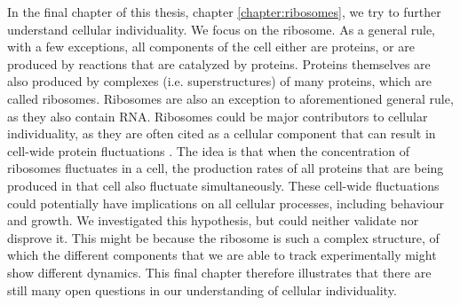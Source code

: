 In the final chapter of this thesis, chapter \ref{chapter:ribosomes}, we try to further understand cellular individuality.
%
We focus on the ribosome.
%
As a general rule, 
with a few exceptions, all components of the cell either are proteins, or are produced by reactions that are catalyzed by proteins.
%
Proteins themselves are also produced by complexes (i.e. superstructures) of many proteins, which are called ribosomes.
%
Ribosomes are also an exception to aforementioned general rule, 
as they also contain RNA.
Ribosomes could be major contributors to cellular individuality,
as they are often cited as a cellular component that can result in cell-wide protein fluctuations \cite{Davidson2008, Raj2008, Chalancon2012, Bruggeman2018}.
%
The idea is that when the concentration of ribosomes fluctuates in a cell, 
the production rates of all proteins that are being produced in that cell also fluctuate simultaneously.
%
These cell-wide fluctuations could potentially have implications on all cellular processes,
including behaviour and growth. 
%
We investigated this hypothesis, but could neither validate nor disprove it.
%
This might be because the ribosome is such a complex structure,
of which the different components that we are able to track experimentally might show different dynamics.
%
This final chapter therefore illustrates that there are still many open questions 
in our understanding of cellular individuality.

 

































